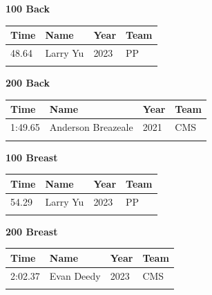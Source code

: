 \vspace{1.2em}
\noindent\begin{minipage}[t]{0.98\textwidth}
\centering
\textbf{\textcolor{teamprimary}{100 Back}}\par
\vspace{0.5em}
\centering
\small
\renewcommand{\arraystretch}{1.0}
\setlength{\tabcolsep}{4pt}
\begin{tabular}{@{}p{2.5cm}p{4.5cm}p{1.5cm}p{2.5cm}@{}}
\toprule
\textbf{Time} & \textbf{Name} & \textbf{Year} & \textbf{Team} \\
\midrule
48.64 & Larry Yu & 2023 & PP \\
\bottomrule
\vspace{0.5em}
\end{tabular}
\end{minipage}
\vspace{1.2em}
\noindent\begin{minipage}[t]{0.98\textwidth}
\centering
\textbf{\textcolor{teamprimary}{200 Back}}\par
\vspace{0.5em}
\centering
\small
\renewcommand{\arraystretch}{1.0}
\setlength{\tabcolsep}{4pt}
\begin{tabular}{@{}p{2.5cm}p{4.5cm}p{1.5cm}p{2.5cm}@{}}
\toprule
\textbf{Time} & \textbf{Name} & \textbf{Year} & \textbf{Team} \\
\midrule
1:49.65 & Anderson Breazeale & 2021 & CMS \\
\bottomrule
\vspace{0.5em}
\end{tabular}
\end{minipage}
\vspace{1.2em}
\noindent\begin{minipage}[t]{0.98\textwidth}
\centering
\textbf{\textcolor{teamprimary}{100 Breast}}\par
\vspace{0.5em}
\centering
\small
\renewcommand{\arraystretch}{1.0}
\setlength{\tabcolsep}{4pt}
\begin{tabular}{@{}p{2.5cm}p{4.5cm}p{1.5cm}p{2.5cm}@{}}
\toprule
\textbf{Time} & \textbf{Name} & \textbf{Year} & \textbf{Team} \\
\midrule
54.29 & Larry Yu & 2023 & PP \\
\bottomrule
\vspace{0.5em}
\end{tabular}
\end{minipage}
\vspace{1.2em}
\noindent\begin{minipage}[t]{0.98\textwidth}
\centering
\textbf{\textcolor{teamprimary}{200 Breast}}\par
\vspace{0.5em}
\centering
\small
\renewcommand{\arraystretch}{1.0}
\setlength{\tabcolsep}{4pt}
\begin{tabular}{@{}p{2.5cm}p{4.5cm}p{1.5cm}p{2.5cm}@{}}
\toprule
\textbf{Time} & \textbf{Name} & \textbf{Year} & \textbf{Team} \\
\midrule
2:02.37 & Evan Deedy & 2023 & CMS \\
\bottomrule
\vspace{0.5em}
\end{tabular}
\end{minipage}
